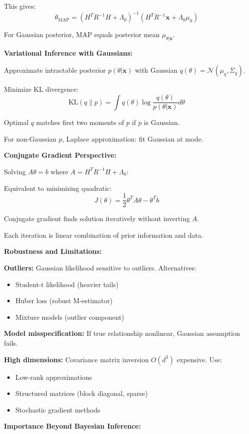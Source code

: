 \documentclass[12pt]{article}
\begin{document}
\begin{explanation}
This gives:
\[
\theta_{\text{MAP}} = (H^TR^{-1}H + \Lambda_0)^{-1}(H^TR^{-1}\mathbf{x} + \Lambda_0\mu_0)
\]

For Gaussian posterior, MAP equals posterior mean $\mu_{\theta|\mathbf{x}}$.

\textbf{Variational Inference with Gaussians:}

Approximate intractable posterior $p(\theta | \mathbf{x})$ with Gaussian $q(\theta) = \mathcal{N}(\mu_q, \Sigma_q)$.

Minimize KL divergence:
\[
\text{KL}(q \| p) = \int q(\theta)\log\frac{q(\theta)}{p(\theta | \mathbf{x})}d\theta
\]

Optimal $q$ matches first two moments of $p$ if $p$ is Gaussian.

For non-Gaussian $p$, Laplace approximation: fit Gaussian at mode.

\textbf{Conjugate Gradient Perspective:}

Solving $A\theta = b$ where $A = H^TR^{-1}H + \Lambda_0$:

Equivalent to minimizing quadratic:
\[
J(\theta) = \frac{1}{2}\theta^TA\theta - \theta^Tb
\]

Conjugate gradient finds solution iteratively without inverting $A$.

Each iteration is linear combination of prior information and data.

\textbf{Robustness and Limitations:}

\textbf{Outliers:} Gaussian likelihood sensitive to outliers. Alternatives:
\begin{itemize}
    \item Student-t likelihood (heavier tails)
    \item Huber loss (robust M-estimator)
    \item Mixture models (outlier component)
\end{itemize}

\textbf{Model misspecification:} If true relationship nonlinear, Gaussian assumption fails.

\textbf{High dimensions:} Covariance matrix inversion $O(d^3)$ expensive. Use:
\begin{itemize}
    \item Low-rank approximations
    \item Structured matrices (block diagonal, sparse)
    \item Stochastic gradient methods
\end{itemize}

\textbf{Importance Beyond Bayesian Inference:}


\end{explanation}
\end{document}
